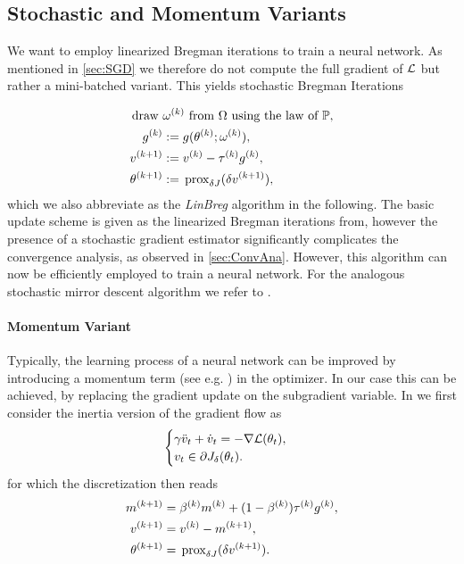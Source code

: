 \subsection{Stochastic and Momentum Variants}\label{sec:Bregmom}
%
%
We want to employ linearized Bregman iterations to train a neural network. As mentioned in \cref{sec:SGD} we therefore do not compute the full gradient of $\mathcal{L}$ but rather a mini-batched variant. This yields stochastic Bregman Iterations
%

\begin{align}\label{eq:stochlinbreg}
	\begin{split}
		\text{draw }&\omega^{(k)}\text{ from }\Omega\text{ using the law of }\mathbb{P},\\
		g^{(k)} &:= {g(\theta^{(k)};\omega^{(k)})},\\
		v^{(k+1)} &:= v^{(k)} - \tau^{(k)} g^{(k)},\\
		\theta^{(k+1)} &:= \,\mathrm{prox}_{\delta J}(\delta v^{(k+1)}),
	\end{split}
\end{align}
%
which we also abbreviate as the \emph{LinBreg} algorithm in the following.
%
The basic update scheme is given as the linearized Bregman iterations from\cite{osher2005iterative}, however the presence of a stochastic gradient estimator significantly complicates the convergence analysis, as observed in \cref{sec:ConvAna}. However, this algorithm can now be efficiently employed to train a neural network. For the analogous stochastic mirror descent algorithm we refer to \cite{nemirovski2009robust}.
%
\paragraph{Momentum Variant} Typically, the learning process of a neural network can be improved by introducing a momentum term (see e.g. \cite{nesterov1983method, qian1999momentum}) in the optimizer. In our case this can be achieved, by replacing the gradient update on the subgradient variable. In \cite{bungert2022bregman} we first consider the inertia version of the gradient flow as
%
\begin{align*}
	\begin{cases}
		\gamma \ddot{v}_t + \dot{v}_t = -\nabla\mathcal{L}(\theta_t), \\
		v_t \in \partial J_\delta(\theta_t).
	\end{cases}
\end{align*}
%
for which the discretization then reads
%
\begin{align}\label{eq:momBreg}
	\begin{split}
		m^{(k+1)} &= \beta^{(k)} m^{(k)} + (1-\beta^{(k)})\tau^{(k)} g^{(k)},\\
		v^{(k+1)} &= v^{(k)} - m^{(k+1)},\\
		\theta^{(k+1)} &= \,\mathrm{prox}_{\delta J}(\delta v^{(k+1)}).
	\end{split}
\end{align}
%
%
